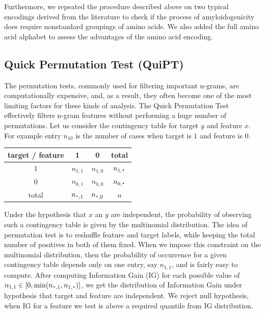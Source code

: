 \documentclass[a4,center,fleqn]{NAR}
\newcommand*{\bigcdot}{\raisebox{-0.25ex}{\scalebox{1.5}{$\cdot$}}}
\begin{document}
  Furthermore, we repeated the procedure described above on two typical 
encodings derived from the literature to check if the process of 
%
%
%
%
%
amyloidogenicity does require nonstandard groupings of amino acids. We also 
added the full amino acid alphabet to assess the advantages of the amino acid 
encoding.

\subsection{Quick Permutation Test (QuiPT)}

The permutation tests, commonly used for filtering important n-grams, are 
computationally expensive, and, as a result, they often become one of the most
limiting factors for these kinds of analysis. 
The Quick Permutation Test effectively filters 
n-gram features without performing a huge number of permutations. Let us 
consider the contingency table for target $y$ and feature $x$. For example 
entry $n_{10}$ is the number of cases when target is $1$ and feature is $0$.

\begin{center}
\begin{tabular}{ | c || c | c | c | }
  \hline			
  target / feature & 1 & 0 & total\\ \hline
 1 & $n_{1,1}$ & $n_{1,0}$ & $n_{1,\bigcdot}$ \\
 0 & $n_{0,1}$ & $n_{0,0}$ & $n_{0,\bigcdot}$ \\ \hline
 total & $n_{\bigcdot,1}$ & $n_{\bigcdot,0}$ & $n$ \\
  \hline  
\end{tabular} 
\end{center}

  Under the hypothesis that $x$ an $y$ are independent, the probability of 
observing such a contingency table is given by the multinomial distribution. The 
idea of permutation test is to reshuffle feature and target labels, while 
keeping the total number of positives in both of them fixed. When we impose this 
constraint on the multinomial distribution, then the probability of occurrence 
for a given contingency table depends only on one entry, say $n_{1,1}$, and is 
fairly easy to compute. After computing Information Gain (IG) for each possible 
value of $n_{1,1} \in [0,\min(n_{\bigcdot, 1}, n_{1, \bigcdot})]$, we get the 
distribution of Information Gain under hypothesis that target and feature are 
independent. We reject null hypothesis, when IG for a feature we test is above a 
required quantile from IG distribution.
\end{document}
